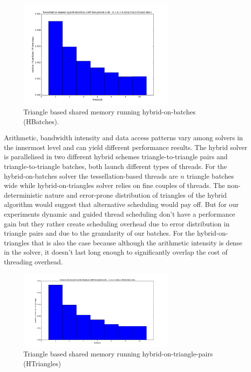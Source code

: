 \documentclass[times,12pt]{article}
\begin{document}
\begin{figure}[htb]
  \begin{center}
    \includegraphics[width=0.7\textwidth]{experiments/omp/hbatches_omp_triangles_200.png}
  \end{center}
  \caption{Triangle based shared memory running hybrid-on-batches (HBatches).}
  \label{figure:hbatches_triangles_triangle_omp10}
\end{figure}

Arithmetic, bandwidth intensity and data access patterns vary among solvers in the innermost level and can yield different performance results. The hybrid solver is parallelised in two different hybrid schemes triangle-to-triangle pairs and triangle-to-triangle batches, both launch different types of threads. For the hybrid-on-batches solver the tessellation-based threads
are $n$ triangle batches wide while hybrid-on-triangles solver relies on fine couples of threads. The non-deterministic nature and error-prone distribution of triangles of the hybrid algorithm  would suggest that alternative scheduling would pay off. But for our experiments dynamic and guided thread scheduling don't have a performance gain but they rather create scheduling overhead due to error distribution in triangle pairs and due to the granularity of our batches. For the hybrid-on-triangles that is also the case because although the arithmetic intensity is dense in the solver, it doesn't last long enough to significantly overlap the cost of threading overhead. 

\begin{figure}[htb]
  \begin{center}
    \includegraphics[width=0.7\textwidth]{experiments/omp/htriangle_omp_triangles_200.png}
  \end{center}
  \caption{Triangle based shared memory running hybrid-on-triangle-pairs (HTriangles)}
  \label{figure:htriangles_triangles_triangle_omp11}
\end{figure}
\end{document}
